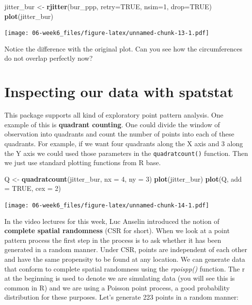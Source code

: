\documentclass[]{book}
\newenvironment{Shaded}{\begin{snugshade}}{\end{snugshade}}
\newcommand{\DataTypeTok}[1]{\textcolor[rgb]{0.13,0.29,0.53}{#1}}
\newcommand{\DecValTok}[1]{\textcolor[rgb]{0.00,0.00,0.81}{#1}}
\newcommand{\KeywordTok}[1]{\textcolor[rgb]{0.13,0.29,0.53}{\textbf{#1}}}
\newcommand{\NormalTok}[1]{#1}
\newcommand{\OtherTok}[1]{\textcolor[rgb]{0.56,0.35,0.01}{#1}}
\newcommand{\StringTok}[1]{\textcolor[rgb]{0.31,0.60,0.02}{#1}}
\begin{document}
\begin{Shaded}
\begin{Highlighting}[]
\NormalTok{jitter_bur <-}\StringTok{ }\KeywordTok{rjitter}\NormalTok{(bur_ppp, }\DataTypeTok{retry=}\OtherTok{TRUE}\NormalTok{, }\DataTypeTok{nsim=}\DecValTok{1}\NormalTok{, }\DataTypeTok{drop=}\OtherTok{TRUE}\NormalTok{)}
\KeywordTok{plot}\NormalTok{(jitter_bur)}
\end{Highlighting}
\end{Shaded}

\texttt{[image: 06-week6\_files/figure-latex/unnamed-chunk-13-1.pdf]}

Notice the difference with the original plot. Can you see how the circumferences do not overlap perfectly now?

\hypertarget{inspecting-our-data-with-spatstat}{%
\section{Inspecting our data with spatstat}\label{inspecting-our-data-with-spatstat}}

This package supports all kind of exploratory point pattern analysis. One example of this is \textbf{quadrant counting}. One could divide the window of observation into quadrants and count the number of points into each of these quadrants.
For example, if we want four quadrants along the X axis and 3 along the Y axis we could used those parameters in the \texttt{quadratcount()} function.
Then we just use standard plotting functions from R base.

\begin{Shaded}
\begin{Highlighting}[]
\NormalTok{Q <-}\StringTok{ }\KeywordTok{quadratcount}\NormalTok{(jitter_bur, }\DataTypeTok{nx =} \DecValTok{4}\NormalTok{, }\DataTypeTok{ny =} \DecValTok{3}\NormalTok{)}
\KeywordTok{plot}\NormalTok{(jitter_bur)}
\KeywordTok{plot}\NormalTok{(Q, }\DataTypeTok{add =} \OtherTok{TRUE}\NormalTok{, }\DataTypeTok{cex =} \DecValTok{2}\NormalTok{)}
\end{Highlighting}
\end{Shaded}

\texttt{[image: 06-week6\_files/figure-latex/unnamed-chunk-14-1.pdf]}

In the video lectures for this week, Luc Anselin introduced the notion of \textbf{complete spatial randomness} (CSR for short). When we look at a point pattern process the first step in the process is to ask whether it has been generated in a random manner. Under CSR, points are independent of each other and have the same propensity to be found at any location. We can generate data that conform to complete spatial randomness using the \emph{rpoispp()} function. The r at the beginning is used to denote we are simulating data (you will see this is common in R) and we are using a Poisson point process, a good probability distribution for these purposes. Let's generate 223 points in a random manner:
\end{document}
